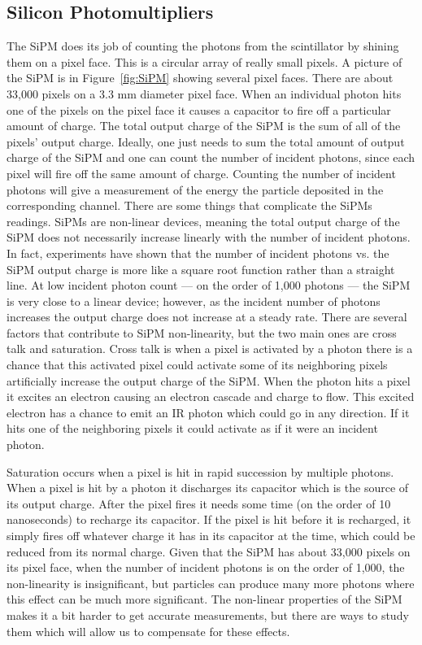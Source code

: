 \subsection{Silicon Photomultipliers}
The SiPM does its job of counting the photons from the scintillator by shining them on a pixel face. This is a circular array of really small pixels. A picture of the SiPM is in Figure~\ref{fig:SiPM} showing several pixel faces. There are about 33,000 pixels on a 3.3 mm diameter pixel face. When an individual photon hits one of the pixels on the pixel face it causes a capacitor to fire off a particular amount of charge. The total output charge of the SiPM is the sum of all of the pixels' output charge. Ideally, one just needs to sum the total amount of output charge of the SiPM and one can count the number of incident photons, since each pixel will fire off the same amount of charge. Counting the number of incident photons will give a measurement of the energy the particle deposited in the corresponding channel. There are some things that complicate the SiPMs readings. SiPMs are non-linear devices, meaning the total output charge of the SiPM does not necessarily increase linearly with the number of incident photons. In fact, experiments have shown that the number of incident photons vs. the SiPM output charge is more like a square root function rather than a straight line. At low incident photon count --- on the order of 1,000 photons --- the SiPM is very close to a linear device; however, as the incident number of photons increases the output charge does not increase at a steady rate. There are several factors that contribute to SiPM non-linearity, but the two main ones are cross talk and saturation. Cross talk is when a pixel is activated by a photon there is a chance that this activated pixel could activate some of its neighboring pixels artificially increase the output charge of the SiPM. When the photon hits a pixel it excites an electron causing an electron cascade and charge to flow. This excited electron has a chance to emit an IR photon which could go in any direction. If it hits one of the neighboring pixels it could activate as if it were an incident photon. 

Saturation occurs when a pixel is hit in rapid succession by multiple photons. When a pixel is hit by a photon it discharges its capacitor which is the source of its output charge. After the pixel fires it needs some time (on the order of 10 nanoseconds) to recharge its capacitor. If the pixel is hit before it is recharged, it simply fires off whatever charge it has in its capacitor at the time, which could be reduced from its normal charge. Given that the SiPM has about 33,000 pixels on its pixel face, when the number of incident photons is on the order of 1,000, the non-linearity is insignificant, but particles can produce many more photons where this effect can be much more significant. The non-linear properties of the SiPM makes it a bit harder to get accurate measurements, but there are ways to study them which will allow us to compensate for these effects.

